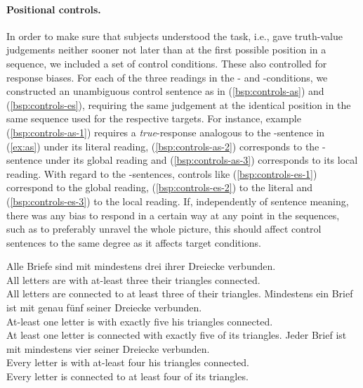 \documentclass[fleqn,reqno,10pt,draft]{article}
\newcommand{\as}{\acro{as}}
\renewcommand{\es}{\acro{es}}
\begin{document}
\paragraph{Positional controls.} In order to make sure that subjects
understood the task, i.e., gave truth-value judgements neither sooner
not later than at the first possible position in a sequence, we
included a set of control conditions. These also controlled for
response biases. For each of the three readings in the \as- and
\es-conditions, we constructed an unambiguous control sentence as in
(\ref{bsp:controls-as}) and (\ref{bsp:controls-es}), requiring the
same judgement at the identical position in the same sequence used for
the respective targets. For instance, example
(\ref{bsp:controls-as-1}) requires a \emph{true}-response analogous to
the \as-sentence in (\ref{ex:as}) under its literal reading,
(\ref{bsp:controls-as-2}) corresponds to the \as-sentence under its
global reading and (\ref{bsp:controls-as-3}) corresponds to its local
reading. With regard to the \es-sentences, controls like
(\ref{bsp:controls-es-1}) correspond to the global reading,
(\ref{bsp:controls-es-2}) to the literal and (\ref{bsp:controls-es-3})
to the local reading. If, independently of sentence meaning, there was
any bias to respond in a certain way at any point in the sequences,
such as to preferably unravel the whole picture, this should affect
control sentences to the same degree as it affects target conditions.

\begin{exe}
  \ex \label{bsp:controls-as}
    \begin{xlist}
\ex \label{bsp:controls-as-1} \gll Alle Briefe sind mit mindestens drei ihrer Dreiecke verbunden.\\
  All letters are with at-least three their triangles connected.\\
  \trans All letters are connected to at least three of their triangles.
\ex \label{bsp:controls-as-2} \gll Mindestens ein Brief ist mit genau f\"unf seiner Dreiecke verbunden.\\
  At-least one letter is with exactly five his triangles connected.\\
  \trans At least one letter is connected with exactly five of its triangles.
\ex \label{bsp:controls-as-3} \gll Jeder Brief ist mit mindestens vier seiner Dreiecke verbunden.\\
  Every letter is with at-least four his triangles connected.\\
  \trans Every letter is connected to at least four of its triangles.
\end{xlist}
\end{exe}
\end{document}
